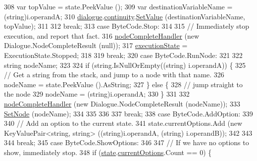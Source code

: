\begin{DoxyCode}
308                 var topValue = state.PeekValue ();
309                 var destinationVariableName = (string)i.operandA;
310                 \hyperlink{a00138_ac506426c503da5f033247c29e11c5e82}{dialogue}.\hyperlink{a00072_ae94eaa4b03b432422f5d205fabe37ff5}{continuity}.\hyperlink{a00166_aa90ff61224432c5ed3ce72199c55f440}{SetValue} (destinationVariableName, topValue);
311 
312                 \textcolor{keywordflow}{break};
313             \textcolor{keywordflow}{case} ByteCode.Stop:
314 
315                 \textcolor{comment}{// Immediately stop execution, and report that fact.}
316                 \hyperlink{a00138_a5129c63e67e2d4e2780d86b8351320a2}{nodeCompleteHandler} (\textcolor{keyword}{new} Dialogue.NodeCompleteResult (null));
317                 \hyperlink{a00138_a66491da06023dabfb63d09e6ccbba74f}{executionState} = ExecutionState.Stopped;
318 
319                 \textcolor{keywordflow}{break};
320             \textcolor{keywordflow}{case} ByteCode.RunNode:
321 
322                 \textcolor{keywordtype}{string} nodeName;
323 
324                 \textcolor{keywordflow}{if} (\textcolor{keywordtype}{string}.IsNullOrEmpty((\textcolor{keywordtype}{string}) i.operandA)) \{
325                     \textcolor{comment}{// Get a string from the stack, and jump to a node with that name.}
326                      nodeName = state.PeekValue ().AsString;
327                 \} \textcolor{keywordflow}{else} \{
328                     \textcolor{comment}{// jump straight to the node}
329                     nodeName = (string)i.operandA;
330                 \}
331 
332                 \hyperlink{a00138_a5129c63e67e2d4e2780d86b8351320a2}{nodeCompleteHandler} (\textcolor{keyword}{new} Dialogue.NodeCompleteResult (nodeName));
333                 \hyperlink{a00138_a6364593ea1115d65e34b343422cfbbbd}{SetNode} (nodeName);
334 
335 
336 
337                 \textcolor{keywordflow}{break};
338             \textcolor{keywordflow}{case} ByteCode.AddOption:
339 
340                 \textcolor{comment}{// Add an option to the current state.}
341                 state.currentOptions.Add (\textcolor{keyword}{new} KeyValuePair<string, string> ((string)i.operandA, (\textcolor{keywordtype}{string})
      i.operandB));
342 
343 
344                 \textcolor{keywordflow}{break};
345             \textcolor{keywordflow}{case} ByteCode.ShowOptions:
346 
347                 \textcolor{comment}{// If we have no options to show, immediately stop.}
348                 \textcolor{keywordflow}{if} (\hyperlink{a00138_a70f2ce6201cdd2430ceaa764ac614ca0}{state}.\hyperlink{a00141_ab816dfea32ecda23282700f01454e0a9}{currentOptions}.Count == 0) \{

\end{DoxyCode}
